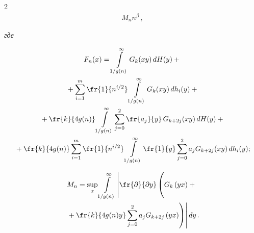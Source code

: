 \begin{multicols}{2}
\begin{multline*}
{M_n}{n^{\beta}}\,,


\end{multline*}


\textit{где}


\begin{multline*}




F_{n}(x) = \int\limits^{\infty}_{1/g(n)} G_k(xy)\,dH(y) + {}\\


{}+


\sum\limits_{i=1}^{m}\fr{1}{n^{i/2}}\int\limits^{\infty}_{1/g(n)} G_k(xy)\,dh_i(y) 


+{} \\


{}+\fr{k}{4 g(n)} \int\limits_{1/g(n)}^\infty \sum\limits_{j=0}^{2} 


\fr{a_j}{y}\,G_{k+2j}(xy) \,dH(y)


+{}\\


{}+ \fr{k}{4 g(n)} \sum\limits_{i=1}^{m}\fr{1}{n^{i/2}} \int\limits_{1/g(n)}^\infty 


\fr{1}{y} \sum\limits_{j=0}^{2}a_j G_{k+2j}(xy)\,dh_i(y);


\end{multline*}





\vspace*{-12pt}





\noindent


\begin{multline*}




M_n=  \sup\limits_{x}    \int\limits_{1/g(n)}^{\infty}  \left\vert


\fr{\partial}{\partial y} 


\left( 


\vphantom{\sum\limits_{j=0}^{2}}


G_k\left(yx \right) + {}\right.\right.\\


\left.\left.{}+\fr{k}{4g(n)y}\sum\limits_{j=0}^{2}a_j G_{k+2j}\left(yx 


\right) \right)\right\vert dy\,.


\end{multline*}






\end{multicols}
